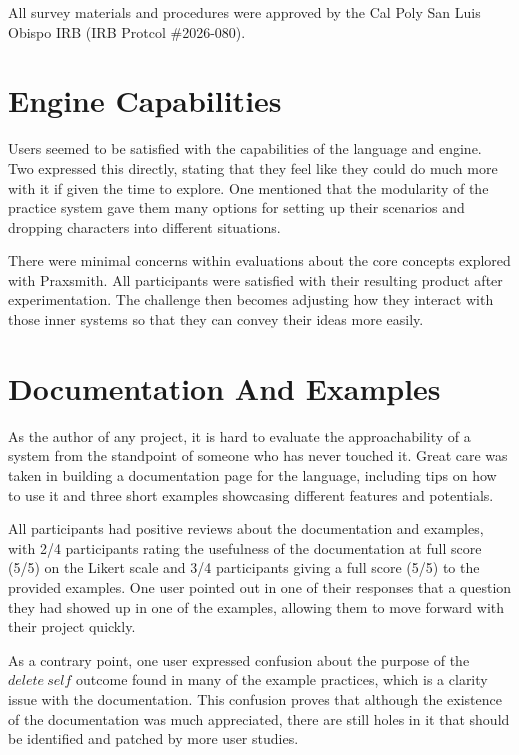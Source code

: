 All survey materials and procedures were approved by the Cal Poly San Luis Obispo IRB
(IRB Protcol \#2026-080).

\section{Engine Capabilities} \label{sec:EngineCapabilities}

Users seemed to be satisfied with the capabilities of the language and engine. Two
expressed this directly, stating that they feel like they could do much more with
it if given the time to explore. One mentioned that the modularity of the practice
system gave them many options for setting up their scenarios and dropping characters
into different situations.

There were minimal concerns within evaluations about the
core concepts explored with Praxsmith. All participants were satisfied with their
resulting product after experimentation. The challenge then becomes adjusting how
they interact with those inner systems so that they can convey their ideas more
easily.

\section{Documentation And Examples} \label{sec:DocumentationAndExamples}

As the author of any project, it is hard to evaluate the approachability of a
system from the standpoint of someone who has never touched it. Great care was taken
in building a documentation page for the language, including tips on how to use it
and three short examples showcasing different features and potentials.

All participants had positive reviews about the documentation and examples, with
2\slash 4 participants rating the usefulness of the documentation at full score (5/5) on the
Likert scale and 3\slash 4 participants giving a full score (5/5) to the provided examples.
One user pointed out in one of their responses that a question they had showed up
in one of the examples, allowing them to move forward with their project quickly.

As a contrary point, one user expressed confusion about the purpose of the
$delete\ self$ outcome found in many of the example practices, which is a clarity
issue with the documentation. This confusion proves that although the existence of the
documentation was much appreciated, there are still holes in it that should be
identified and patched by more user studies.

